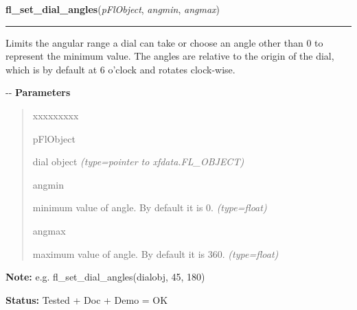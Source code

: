 \hspace{.8\funcindent}\begin{boxedminipage}{\funcwidth}

    \raggedright \textbf{fl\_set\_dial\_angles}(\textit{pFlObject}, \textit{angmin}, \textit{angmax})

    \vspace{-1.5ex}

    \rule{\textwidth}{0.5\fboxrule}
\setlength{\parskip}{2ex}

Limits the angular range a dial can take or choose an angle other
than 0 to represent the minimum value. The angles are relative to the
origin of the dial, which is by default at 6 o'clock and rotates
clock-wise.

-{}-
\setlength{\parskip}{1ex}
      \textbf{Parameters}
      \vspace{-1ex}

      \begin{quote}
        \begin{Ventry}{xxxxxxxxx}

          \item[pFlObject]


dial object
            {\it (type=pointer to xfdata.FL\_OBJECT)}

          \item[angmin]


minimum value of angle. By default it is 0.
            {\it (type=float)}

          \item[angmax]


maximum value of angle. By default it is 360.
            {\it (type=float)}

        \end{Ventry}

      \end{quote}

\textbf{Note:} 
e.g. fl\_set\_dial\_angles(dialobj, 45, 180)


\textbf{Status:} 
Tested + Doc + Demo = OK


    \end{boxedminipage}

    \label{xformslib:fldial:fl_set_dial_cross}

    \vspace{0.5ex}

